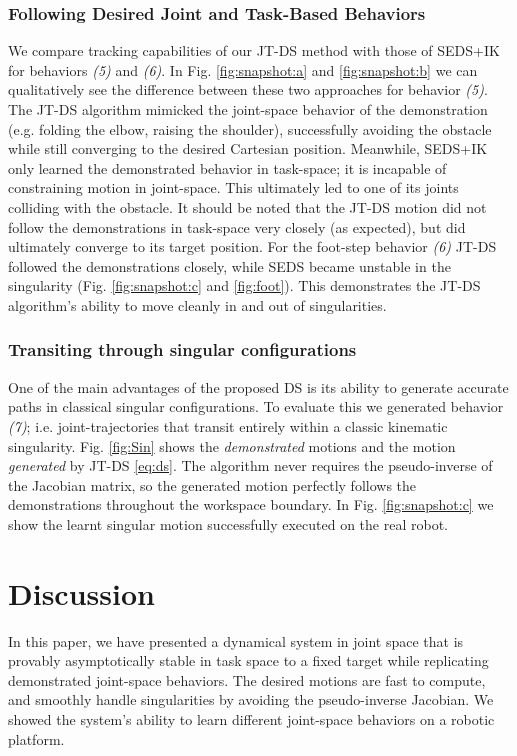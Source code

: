 \documentclass[letterpaper, 10 pt, journal, twoside, fleqn]{IEEEtran}
\begin{document}
\subsubsection{Following Desired Joint and Task-Based Behaviors}
We compare tracking capabilities of our JT-DS method with those of SEDS+IK for behaviors \textit{(5)} and \textit{(6)}. In Fig. \ref{fig:snapshot:a} and \ref{fig:snapshot:b} we can qualitatively see the difference between these two approaches for behavior \textit{(5)}. The JT-DS algorithm mimicked the joint-space behavior of the demonstration (e.g. folding the elbow, raising the shoulder), successfully avoiding the obstacle while still converging to the desired Cartesian position. Meanwhile, SEDS+IK only learned the demonstrated behavior in task-space; it is incapable of constraining motion in joint-space. This ultimately led to one of its joints colliding with the obstacle. It should be noted that the JT-DS motion did not follow the demonstrations in task-space very closely (as expected), but did ultimately converge to its target position. For the foot-step behavior \textit{(6)} JT-DS followed the demonstrations closely, while SEDS became unstable in the singularity (Fig. \ref{fig:snapshot:c} and \ref{fig:foot}). This demonstrates the JT-DS algorithm's ability to move cleanly in and out of singularities.

\subsubsection{Transiting through singular configurations}
One of the main advantages of the proposed DS is its ability to generate accurate paths in classical singular configurations. To evaluate this we generated behavior \textit{(7)}; i.e. joint-trajectories that transit entirely within a classic kinematic singularity. Fig. \ref{fig:Sin} shows the \textit{demonstrated} motions and the motion  \textit{generated} by JT-DS \eqref{eq:ds}. The algorithm never requires the pseudo-inverse of the Jacobian matrix, so the generated motion perfectly follows the demonstrations throughout the workspace boundary. In Fig. \ref{fig:snapshot:c} we show the learnt singular motion successfully  executed on the real robot.

\section{Discussion} 
\label{Sec:Dis}
In this paper, we have presented a dynamical system in joint space that is provably asymptotically stable in task space to a fixed target while replicating demonstrated joint-space behaviors. The desired motions are fast to compute, and smoothly handle singularities by avoiding the pseudo-inverse Jacobian.  We showed the system's ability to learn different joint-space behaviors on a robotic platform.
\end{document}
